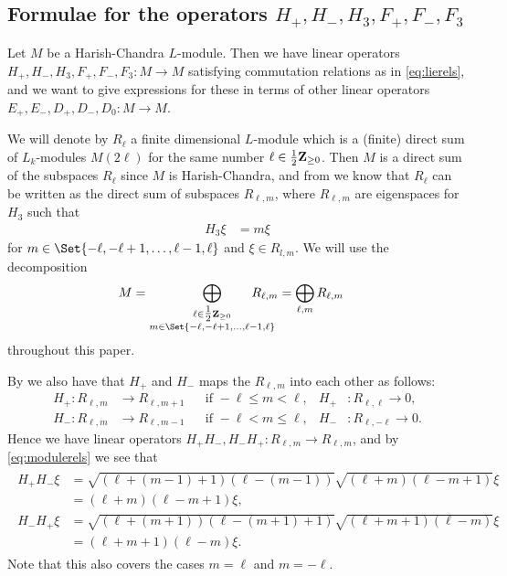 \subsection{Formulae for the operators \texorpdfstring{$H_+,H_-,H_3,F_+,F_-,F_3$}{H\_+,H\_-,H\_3,F\_+,F\_-,F\_3}}\label{sec:formulae}

Let $M$ be a Harish-Chandra $L$-module. Then we have linear operators $H_+, H_-, H_3, F_+, F_-, F_3\colon M\to M$ satisfying commutation relations as in \cref{eq:lierels}, and we want to give expressions for these in terms of other linear operators $E_+,E_-,D_+,D_-,D_0\colon M\to M$. 

We will denote by $R_\ell$ a finite dimensional $L$-module which is a (finite) direct sum of $L_k$-modules $M(2\ell)$ for the same number $\ell\in\tfrac{1}{2}\mathbf{Z}_{\geq 0}$. Then $M$ is a direct sum of the subspaces $R_\ell$ since $M$ is Harish-Chandra, and from  we know that $R_\ell$ can be written as the direct sum of subspaces $R_{\ell,m}$, where $R_{\ell,m}$ are eigenspaces for $H_3$ such that
\begin{align} \label{eq:H3eigen}
  H_3\xi &= m\xi
\end{align}
for $m\in\Set{-\ell,-\ell+1,\dotsc,\ell-1,\ell}$ and $\xi\in R_{l,m}$. We will use the decomposition
\begin{align*}
  M &= \bigoplus_{\substack{\ell\in\tfrac{1}{2}\Z_{\geq 0} \\ m\in\Set{-\ell,-\ell+1,\dotsc,\ell-1,\ell}}} \!\!\!\!\!\!\!\!\!\!\!\! R_{\ell,m} = \bigoplus_{\ell,m} R_{\ell,m}
\end{align*}
throughout this paper.

By  we also have that $H_+$ and $H_-$ maps the $R_{\ell,m}$ into each other as follows:
\begin{align*}
  H_+\colon R_{\ell,m} &\to R_{\ell,m+1} && \mbox{if }-\ell\leq m<\ell, & H_+&\colon R_{\ell,\ell} \to 0, \\
  H_-\colon R_{\ell,m} &\to R_{\ell,m-1} && \mbox{if }-\ell< m\leq \ell, & H_-&\colon R_{\ell,-\ell} \to 0.
\end{align*}
Hence we have linear operators $H_+H_-,H_-H_+\colon R_{\ell,m}\to R_{\ell,m}$, and by \cref{eq:modulerels} we see that
\begin{align}
  \begin{split} \label{eq:H+H-}
    H_+H_-\xi &= \sqrt{(\ell+(m-1)+1)(\ell-(m-1))}\sqrt{(\ell+m)(\ell-m+1)} \xi \\
    &= (\ell+m)(\ell-m+1)\xi, \\
    H_-H_+\xi &= \sqrt{(\ell+(m+1))(\ell-(m+1)+1)}\sqrt{(\ell+m+1)(\ell-m)} \xi \\
    &= (\ell+m+1)(\ell-m)\xi.
  \end{split}
\end{align}
Note that this also covers the cases $m=\ell$ and $m=-\ell$. 

